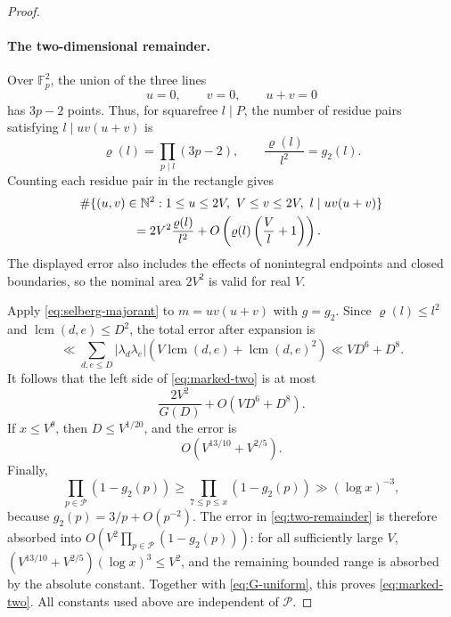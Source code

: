 \documentclass[11pt]{article}
\theoremstyle{definition}
\theoremstyle{remark}
\numberwithin{equation}{section}
\newcommand{\N}{\mathbb N}
\newcommand{\lcm}{\operatorname{lcm}}
\begin{document}
\begin{proof}
\paragraph{The two-dimensional remainder.}
Over \(\mathbb F_p^2\), the union of the three lines
\[
 u=0,\qquad v=0,\qquad u+v=0
\]
has \(3p-2\) points. Thus, for squarefree \(l\mid P\), the number
of residue pairs satisfying \(l\mid uv(u+v)\) is
\[
 \varrho(l)=\prod_{p\mid l}(3p-2),
 \qquad \frac{\varrho(l)}{l^2}=g_2(l).
\]
Counting each residue pair in the rectangle gives
\begin{align}
 &\#\{(u,v)\in\N^2:1\le u\le2V,\ V\le v\le2V,\
                     l\mid uv(u+v)\} \notag\\
 &\hspace{15mm}
 =2V^2\frac{\varrho(l)}{l^2}
  +O\left(\varrho(l)\left(\frac Vl+1\right)\right).
 \label{eq:lattice-remainder}
\end{align}
The displayed error also includes the effects of nonintegral
endpoints and closed boundaries, so the nominal area \(2V^2\) is
valid for real \(V\).

Apply \eqref{eq:selberg-majorant} to \(m=uv(u+v)\) with
\(g=g_2\). Since \(\varrho(l)\le l^2\) and
\(\lcm(d,e)\le D^2\), the total error after expansion is
\[
 \ll
 \sum_{d,e\le D}|\lambda_d\lambda_e|
 \left(V\lcm(d,e)+\lcm(d,e)^2\right)
 \ll VD^6+D^8.
\]
It follows that the left side of \eqref{eq:marked-two} is at most
\begin{equation}\label{eq:two-remainder}
 \frac{2V^2}{G(D)}+O(VD^6+D^8).
\end{equation}
If \(x\le V^\theta\), then \(D\le V^{1/20}\), and the error is
\[
 O(V^{13/10}+V^{2/5}).
\]
Finally,
\[
 \prod_{p\in\mathcal P}(1-g_2(p))
 \ge\prod_{7\le p\le x}(1-g_2(p))
 \gg(\log x)^{-3},
\]
because \(g_2(p)=3/p+O(p^{-2})\). The error in
\eqref{eq:two-remainder} is therefore absorbed into
\(O(V^2\prod_{p\in\mathcal P}(1-g_2(p)))\): for all sufficiently
large \(V\), \((V^{13/10}+V^{2/5})(\log x)^3\le V^2\), and the
remaining bounded range is absorbed by the absolute constant.
Together with \eqref{eq:G-uniform}, this proves
\eqref{eq:marked-two}. All constants used above are independent
of \(\mathcal P\).
\end{proof}
\end{document}
